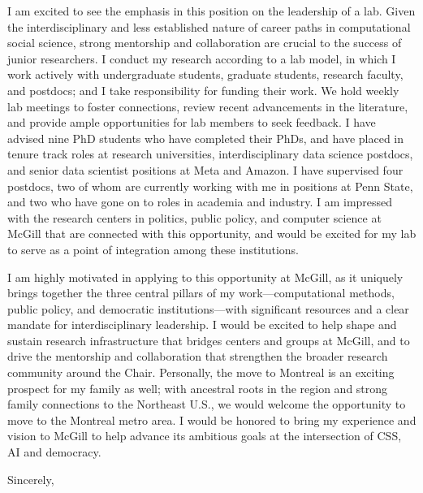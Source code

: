 \documentclass[a4paper,11pt]{letter}
\begin{document}
\begin{letter}
I am excited to see the emphasis in this position on the leadership of a lab. Given the interdisciplinary and less established nature of career paths in computational social science, strong mentorship and collaboration are crucial to the success of junior researchers. I conduct my research according to a lab model, in which I work actively with undergraduate students, graduate students, research faculty, and postdocs; and I take responsibility for funding their work. We hold weekly lab meetings to foster connections, review recent advancements in the literature, and provide ample opportunities for lab members to seek feedback. I have advised nine PhD students who have completed their PhDs, and have placed in tenure track roles at research universities, interdisciplinary data science postdocs, and senior data scientist positions at Meta and Amazon. I have supervised four postdocs, two of whom are currently working with me in positions at Penn State, and two who have gone on to roles in academia and industry. I am impressed with the research centers in politics, public policy, and computer science at McGill that are connected with this opportunity, and would be excited for my lab to serve as a point of integration among these institutions. 

I am highly motivated in applying to this opportunity at McGill, as it uniquely brings together the three central pillars of my work—computational methods, public policy, and democratic institutions—with significant resources and a clear mandate for interdisciplinary leadership. I would be excited to help shape and sustain research infrastructure that bridges centers and groups at McGill, and to drive the mentorship and collaboration that strengthen the broader research community around the Chair. Personally, the move to Montreal is an exciting prospect for my family as well; with ancestral roots in the region and strong family connections to the Northeast U.S., we would welcome the opportunity to move to the Montreal metro area. I would be honored to bring my experience and vision to McGill to help advance its ambitious goals at the intersection of CSS, AI and democracy.

\closing{Sincerely,} 
\end{letter} 
\end{document}
